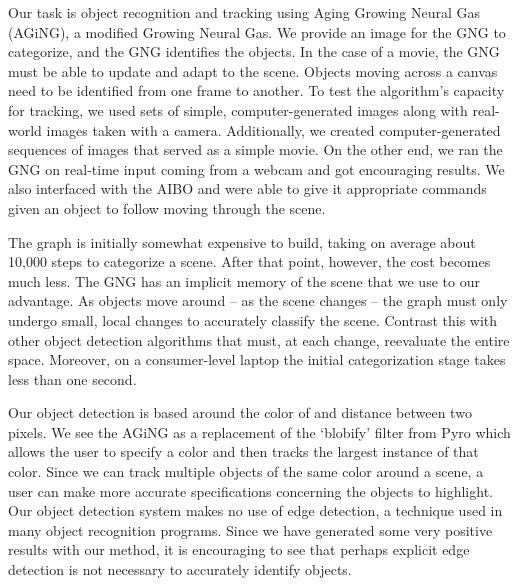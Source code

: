 \documentclass{article}
\renewcommand{\|}{\origbar} %
\begin{document}
Our task is object recognition and tracking using Aging Growing Neural Gas (AGiNG), a modified Growing Neural Gas. We provide an image for the GNG to categorize, and the GNG identifies the objects. In the case of a movie, the GNG must be able to update and adapt to the scene. Objects moving across a canvas need to be identified from one frame to another. To test the algorithm's capacity for tracking, we used sets of simple, computer-generated images along with real-world images taken with a camera. Additionally, we created computer-generated sequences of images that served as a simple movie. On the other end, we ran the GNG on real-time input coming from a webcam and got encouraging results. We also interfaced with the AIBO and were able to give it appropriate commands given an object to follow moving through the scene.

The graph is initially somewhat expensive to build, taking on average about 10,000 steps to categorize a scene. After that point, however, the cost becomes much less. The GNG has an implicit memory of the scene that we use to our advantage. As objects move around -- as the scene changes -- the graph must only undergo small, local changes to accurately classify the scene. Contrast this with other object detection algorithms that must, at each change, reevaluate the entire space. Moreover, on a consumer-level laptop the initial categorization stage takes less than one second. 

Our object detection is based around the color of and distance between two pixels. We see the AGiNG as a replacement of the `blobify' filter from Pyro which allows the user to specify a color and then tracks the largest instance of that color. Since we can track multiple objects of the same color around a scene, a user can make more accurate specifications concerning the objects to highlight. Our object detection system makes no use of edge detection, a technique used in many object recognition programs. Since we have generated some very positive results with our method, it is encouraging to see that perhaps explicit edge detection is not necessary to accurately identify objects.
\end{document}
